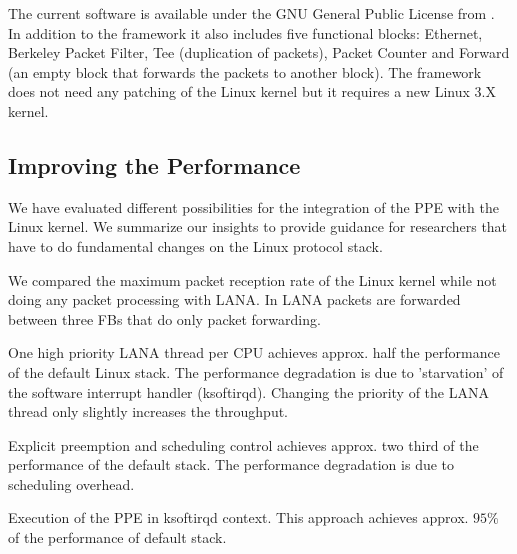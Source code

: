 \documentclass{sig-alternate}
\begin{document}
The current software is available under the GNU General Public License from 
\cite{lana}. In addition to the framework it also includes five functional 
blocks: Ethernet, Berkeley Packet Filter, Tee (duplication of packets), Packet 
Counter and Forward (an empty block that forwards the packets to 
another block). The framework does not need any patching of the Linux kernel
but it requires a new Linux 3.X kernel.

\vspace{-0.15cm}
\subsection{Improving the Performance}
We have evaluated different possibilities for the integration of the PPE with the 
Linux kernel. We summarize our insights to provide guidance for researchers that have to do fundamental changes on the Linux protocol stack.

We compared the maximum packet reception rate of the Linux kernel while not doing any packet processing with LANA. In LANA packets are forwarded between three FBs that do only packet forwarding. 


\begin{compactitem}
\item One high priority LANA thread per CPU achieves approx. half the performance of the default Linux stack. The performance degradation is due to 'starvation' of the software interrupt handler (ksoftirqd). Changing the priority of the LANA thread only slightly increases the throughput.
\item Explicit preemption and scheduling control achieves approx. two third of the performance of the default stack. The performance degradation is due to scheduling overhead. 
\item Execution of the PPE in ksoftirqd context. This approach achieves
      approx. $95\%$ of the performance of default stack.
\end{compactitem}
\end{document}
